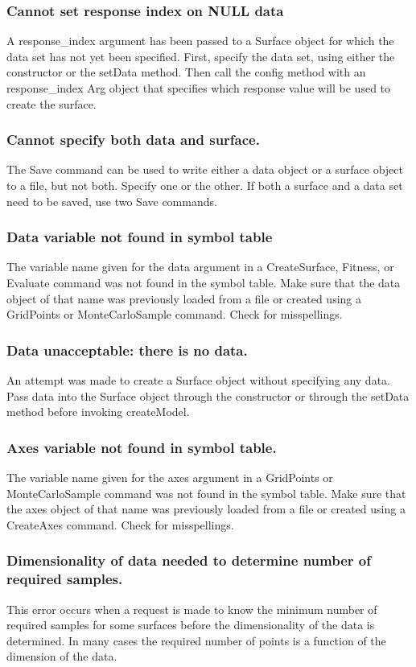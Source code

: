 \documentclass{article}
\begin{document}
\subsubsection{Cannot set response index on NULL data }
A response\_index argument has been passed to a Surface object for which the data set has not yet been specified.  First, specify the data set, using either the constructor or the setData method.  Then call the config method with an response\_index Arg object that specifies which response value will be used to create the surface.

\subsubsection{Cannot specify both data and surface.}
The Save command can be used to write either a data object or a surface object to a file, but not both.  Specify one or the other.  If both a surface and a data set need to be saved, use two Save commands.

\subsubsection{Data variable not found in symbol table}
The variable name given for the data argument in a CreateSurface, Fitness, or Evaluate command was not found in the symbol table.  Make sure that the data object of that name was previously loaded from a file or created using a GridPoints or MonteCarloSample command.  Check for misspellings.

\subsubsection{Data unacceptable: there is no data.}
An attempt was made to create a Surface object without specifying any data.  Pass data into the Surface object through the constructor or through the setData method before invoking createModel.

\subsubsection{Axes variable not found in symbol table.}
The variable name given for the axes argument in a GridPoints or MonteCarloSample command was not found in the symbol table.  Make sure that the axes object of that name was previously loaded from a file or created using a CreateAxes command.  Check for misspellings.

\subsubsection{Dimensionality of data needed to determine number of required samples.}
This error occurs when a request is made to know the minimum number of required samples for some surfaces before the dimensionality of the data is determined.  In many cases the required number of points is a function of the dimension of the data.
\end{document}
